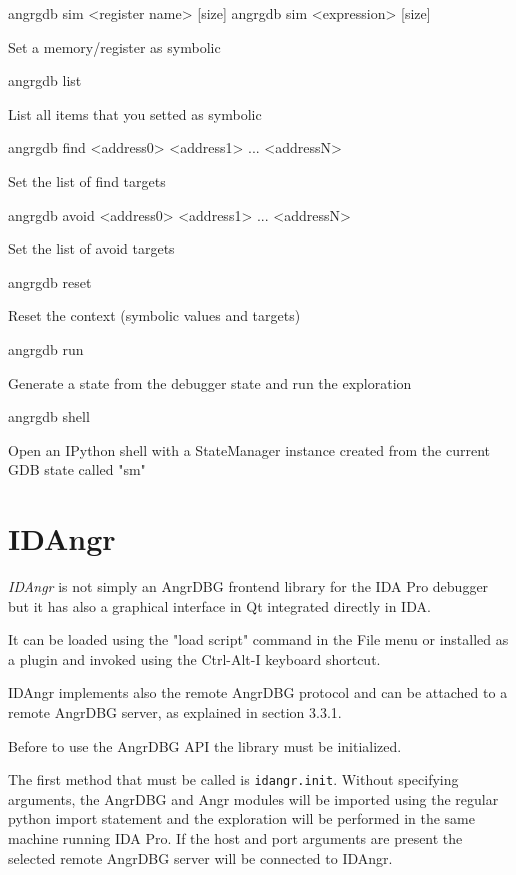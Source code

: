 \begin{code}
angrgdb sim <register name> [size]
angrgdb sim <expression> [size]
\end{code}
Set a memory/register as symbolic

\begin{code}
angrgdb list
\end{code}
List all items that you setted as symbolic

\begin{code}
angrgdb find <address0> <address1> ... <addressN>
\end{code}
Set the list of find targets

\begin{code}
angrgdb avoid <address0> <address1> ... <addressN>
\end{code}
Set the list of avoid targets

\begin{code}
angrgdb reset
\end{code}
Reset the context (symbolic values and targets)

\begin{code}
angrgdb run
\end{code}
Generate a state from the debugger state and run the exploration

\begin{code}
angrgdb shell
\end{code}
Open an IPython shell with a StateManager instance created from the current GDB state called "sm"

\section{IDAngr}

{\em IDAngr} is not simply an AngrDBG frontend library for the IDA Pro \cite{ida} debugger but it has also a graphical interface in Qt integrated directly in IDA.

It can be loaded using the "load script" command in the File menu or installed as a plugin and invoked using the Ctrl-Alt-I keyboard shortcut.

IDAngr implements also the remote AngrDBG protocol and can be attached to a remote AngrDBG server, as explained in section 3.3.1.

Before to use the AngrDBG API the library must be initialized.

The first method that must be called is \verb|idangr.init|. Without specifying arguments, the AngrDBG and Angr modules will be imported using the regular python import statement and the exploration will be performed in the same machine running IDA Pro. If the host and port arguments are present the selected remote AngrDBG server will be connected to IDAngr.

